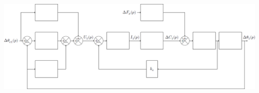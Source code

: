 \documentclass[10pt,fleqn]{article} %
\begin{document}
\begin{center}
\includegraphics[width=\linewidth]{images/fig_03}
\end{center}

%
\end{document}
